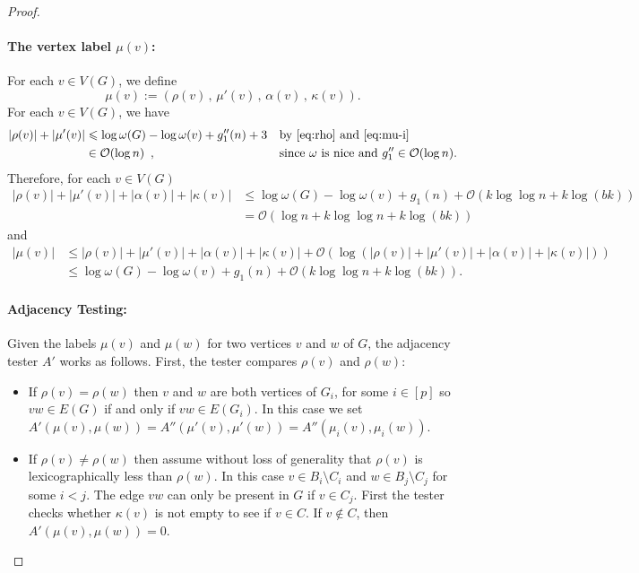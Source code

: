 \documentclass{patmorin}
\renewcommand{\le}{\leqslant}
\renewcommand{\leq}{\leqslant}
\newcommand{\Oh}{\calO}
\let\eqref\cref
\newcommand{\calO}{\mathcal{O}}
\begin{document}
\begin{proof}
    \paragraph{\boldmath The vertex label $\mu(v)$:}
    For each $v\in V(G)$, we define 
    \[
      \mu(v):=
        (\rho(v)\,,\, \mu'(v)\,,\, \alpha(v)\,,\, \kappa(v)).
    \]
For each $v\in V(G)$,  we have 
    \begin{align*}
       |\rho(v)|+|\mu'(v)| 
       & \le \log\omega(G)-\log\omega(v)+g_1''(n)+3&&\textrm{by~\eqref{eq:rho} and~\eqref{eq:mu-i}}\\
       & \in \Oh(\log n) \enspace , &&\textrm{since $\omega$ is nice and $g_1''\in\Oh(\log n)$.}
       \label{rho_mu_len}
    \end{align*}
Therefore, for each $v\in V(G)$
    \begin{align*}  
      |\rho(v)|+|\mu'(v)| + |\alpha(v)| + |\kappa(v)|
      &\leq 
      \log\omega(G)-\log\omega(v) + g_1(n) + \Oh(k\log\log n+k\log(bk))\\
      &=\Oh(\log n + k\log\log n+k\log(bk))
      \end{align*}
      and
      \begin{align*}
      |\mu(v)| &\leq |\rho(v)|+|\mu'(v)| + |\alpha(v)| + |\kappa(v)| + \Oh(\log(|\rho(v)|+|\mu'(v)| + |\alpha(v)| + |\kappa(v)|))\\
      &\leq \log\omega(G)-\log\omega(v) + g_1(n) + \Oh(k\log\log n+k\log(bk)).
    \end{align*}

     \paragraph{Adjacency Testing:}
     Given the labels $\mu(v)$ and $\mu(w)$ for two vertices $v$ and $w$ of $G$, the adjacency tester $A'$ works as follows. First, the tester compares $\rho(v)$ and $\rho(w)$:
     \begin{itemize}
       \item If $\rho(v)=\rho(w)$ then $v$ and $w$ are both vertices of $G_i$, for some $i\in[p]$ so $vw\in E(G)$ if and only if $vw\in E(G_i)$.  In this case we set $A'(\mu(v),\mu(w))=A''(\mu'(v),\mu'(w))=A''(\mu_i(v),\mu_i(w))$.
       \item If $\rho(v)\neq\rho(w)$ then assume without loss of generality that $\rho(v)$ is lexicographically less than $\rho(w)$.
       In this case $v\in B_i\setminus C_i$ and $w\in B_j\setminus C_j$ for some $i < j$.
       The edge $vw$ can only be present in $G$ if $v\in C_j$.
       First the tester checks whether $\kappa(v)$ is not empty to see if $v\in C$.
       If $v\not\in C$, then $A'(\mu(v),\mu(w))=0$.  


\end{itemize}
\end{proof}
\end{document}
